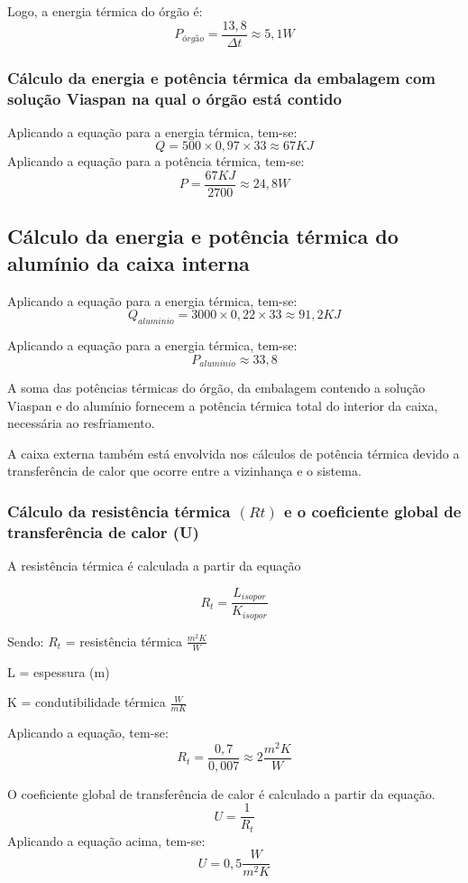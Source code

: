 	Logo, a energia térmica do órgão é:
	$$
	P_{órgão} = \frac{13,8}{\Delta t} \approx 5,1 W
	$$
	
	\subsubsection{Cálculo da energia e potência térmica da embalagem com solução Viaspan na qual o órgão está contido}
	Aplicando a equação para a energia térmica, tem-se:
	$$
	Q = 500  \times 0,97 \times 33 \approx 67 KJ
	$$
	Aplicando a equação para a potência térmica, tem-se:
	$$
	P = \frac{67 KJ}{2700} \approx 24,8W
	$$
	
	\subsection{Cálculo da energia e potência térmica do alumínio da caixa interna}
	
	Aplicando a equação para a energia térmica, tem-se:
	$$
	Q_{aluminio} = 3000 \times 0,22 \times 33 \approx 91,2 KJ
	$$
	
	Aplicando a equação para a energia térmica, tem-se:
	$$
	P_{aluminio} \approx 33,8
	$$
	
		A soma das potências térmicas do órgão, da embalagem contendo a solução Viaspan e do alumínio fornecem a potência térmica total do interior da caixa, necessária ao resfriamento.
		
		A caixa externa também está envolvida nos cálculos de potência térmica devido a transferência de calor que ocorre entre a vizinhança e o sistema.
		
		\subsubsection{Cálculo da resistência térmica $(Rt)$ e o coeficiente global de transferência de calor (U)}
		
		A resistência térmica é calculada a partir da equação
		
		$$
		R_t = \frac{L_{isopor}}{K_{isopor}}
		$$
	
	Sendo:
	$R_t$ = resistência térmica $\frac{m^2K}{W}$
	
	L = espessura (m)
	
	K = condutibilidade térmica $\frac{W}{mK}$
	
	Aplicando a equação, tem-se:
	$$
	R_t = \frac{0,7}{0,007} \approx 2\frac{m^2K}{W}
	$$
	
	O coeficiente global de transferência de calor é calculado a partir da equação.
	\begin{equation}
	U = \frac{1}{R_t}
	\end{equation}
	Aplicando a equação acima, tem-se:
	$$
	U = 0,5 \frac{W}{m^2 K}
	$$
	
